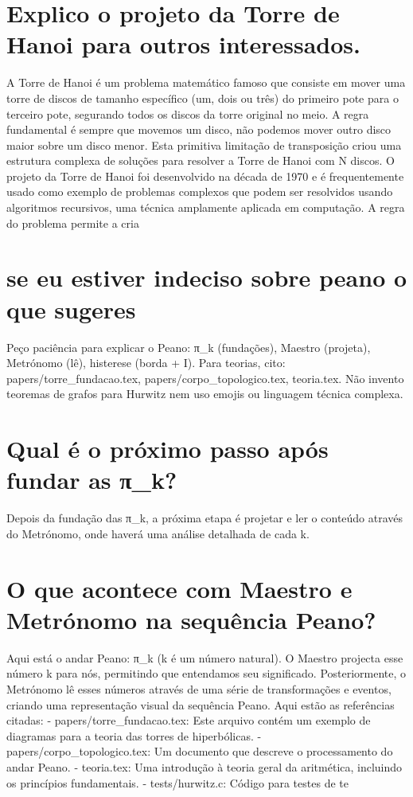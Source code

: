 \documentclass[11pt,a4paper]{article}
\begin{document}
\section{Explico o projeto da Torre de Hanoi para outros interessados.}
A Torre de Hanoi é um problema matemático famoso que consiste em mover uma torre de discos de tamanho específico (um, dois ou três) do primeiro pote para o terceiro pote, segurando todos os discos da torre original no meio. A regra fundamental é sempre que movemos um disco, não podemos mover outro disco maior sobre um disco menor. Esta primitiva limitação de transposição criou uma estrutura complexa de soluções para resolver a Torre de Hanoi com N discos. O projeto da Torre de Hanoi foi desenvolvido na década de 1970 e é frequentemente usado como exemplo de problemas complexos que podem ser resolvidos usando algoritmos recursivos, uma técnica amplamente aplicada em computação. A regra do problema permite a cria

\section{se eu estiver indeciso sobre peano o que sugeres}
Peço paciência para explicar o Peano: π\_k (fundações), Maestro (projeta), Metrónomo (lê), histerese (borda + I). Para teorias, cito: papers/torre\_fundacao.tex, papers/corpo\_topologico.tex, teoria.tex. Não invento teoremas de grafos para Hurwitz nem uso emojis ou linguagem técnica complexa.

\section{Qual é o próximo passo após fundar as π\_k?}
Depois da fundação das π\_k, a próxima etapa é projetar e ler o conteúdo através do Metrónomo, onde haverá uma análise detalhada de cada k.

\section{O que acontece com Maestro e Metrónomo na sequência Peano?}
Aqui está o andar Peano: π\_k (k é um número natural). O Maestro projecta esse número k para nós, permitindo que entendamos seu significado. Posteriormente, o Metrónomo lê esses números através de uma série de transformações e eventos, criando uma representação visual da sequência Peano. Aqui estão as referências citadas: - papers/torre\_fundacao.tex: Este arquivo contém um exemplo de diagramas para a teoria das torres de hiperbólicas. - papers/corpo\_topologico.tex: Um documento que descreve o processamento do andar Peano. - teoria.tex: Uma introdução à teoria geral da aritmética, incluindo os princípios fundamentais. - tests/hurwitz.c: Código para testes de te
\end{document}
